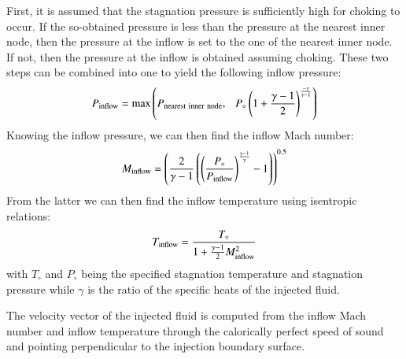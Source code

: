 \documentclass{warpdoc}
\begin{document}
First, it is assumed that the stagnation pressure is sufficiently high for choking to occur. If the so-obtained pressure is less than the pressure at the nearest inner node, then the pressure at the inflow is set to the one of the nearest inner node. If not, then the pressure at the inflow is obtained assuming choking. These two steps can be combined into one to yield the following inflow pressure:
%
\begin{equation}
P_{\rm inflow}=\max\left(
  P_{\rm nearest~inner~node},~~~
  P_\circ \left(1+\frac{\gamma-1}{2}\right)^\frac{-\gamma}{\gamma-1}\right)
\end{equation}
% 
Knowing the inflow pressure, we can then find the inflow Mach number:
%
\begin{equation}
M_{\rm inflow}=\left(\frac{2}{\gamma-1} \left(\left(\frac{P_\circ}{P_{\rm inflow}}\right)^{\frac{\gamma-1}{\gamma}} -1\right) \right)^{0.5}
\end{equation}
%
From the latter we can then find the inflow temperature using isentropic relations:
%
\begin{equation}
T_{\rm inflow}=\frac{T_\circ}{1+\frac{\gamma-1}{2}M_{\rm inflow}^2}
\end{equation}
%
with $T_\circ$ and $P_\circ$ being the specified stagnation temperature and stagnation pressure while $\gamma$ is the ratio of the specific heats of the injected fluid.

The velocity vector of the injected fluid is computed from the inflow Mach number and inflow temperature through the calorically perfect speed of sound and pointing perpendicular to the injection boundary surface.


  
  


%             
\end{document}
